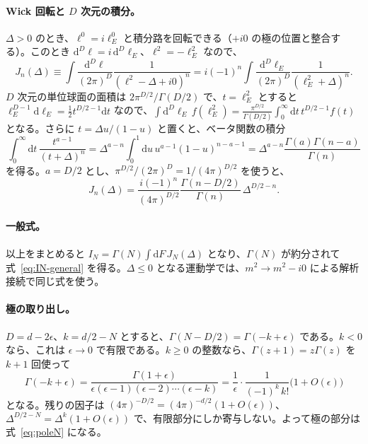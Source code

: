 \documentclass[a4paper,10pt]{ltjsarticle}
\newcommand{\dd}{\mathrm{d}}
\begin{document}
\paragraph{Wick 回転と $D$ 次元の積分。}$\Delta>0$ のとき、$\ell^0=i\ell_E^0$ と積分路を回転できる（$+i0$ の極の位置と整合する）。このとき $\dd^D\ell=i\,\dd^D\ell_E$、$\ell^2=-\ell_E^2$ なので、
\begin{equation*}
J_n(\Delta)\equiv\int\frac{\dd^D\ell}{(2\pi)^D}\frac{1}{(\ell^2-\Delta+i0)^n}=i(-1)^n\int\frac{\dd^D\ell_E}{(2\pi)^D}\frac{1}{(\ell_E^2+\Delta)^n}.
\end{equation*}
$D$ 次元の単位球面の面積は $2\pi^{D/2}/\Gamma(D/2)$ で、$t=\ell_E^2$ とすると $\ell_E^{D-1}\dd\ell_E=\tfrac12t^{D/2-1}\dd t$ なので、$\int\dd^D\ell_E\,f(\ell_E^2)=\frac{\pi^{D/2}}{\Gamma(D/2)}\int_0^\infty\dd t\,t^{D/2-1}f(t)$ となる。さらに $t=\Delta u/(1-u)$ と置くと、ベータ関数の積分
\begin{equation*}
\int_0^\infty\dd t\,\frac{t^{a-1}}{(t+\Delta)^n}=\Delta^{a-n}\int_0^1\dd u\,u^{a-1}(1-u)^{n-a-1}=\Delta^{a-n}\frac{\Gamma(a)\Gamma(n-a)}{\Gamma(n)}
\end{equation*}
を得る。$a=D/2$ とし、$\pi^{D/2}/(2\pi)^D=1/(4\pi)^{D/2}$ を使うと、
\begin{equation*}
J_n(\Delta)=\frac{i(-1)^n}{(4\pi)^{D/2}}\frac{\Gamma(n-D/2)}{\Gamma(n)}\,\Delta^{D/2-n}.
\end{equation*}

\paragraph{一般式。}以上をまとめると $I_N=\Gamma(N)\int\dd F\,J_N(\Delta)$ となり、$\Gamma(N)$ が約分されて式~\eqref{eq:IN-general} を得る。$\Delta\le0$ となる運動学では、$m^2\to m^2-i0$ による解析接続で同じ式を使う。

\paragraph{極の取り出し。}$D=d-2\epsilon$、$k=d/2-N$ とすると、$\Gamma(N-D/2)=\Gamma(-k+\epsilon)$ である。$k<0$ なら、これは $\epsilon\to0$ で有限である。$k\ge0$ の整数なら、$\Gamma(z+1)=z\Gamma(z)$ を $k+1$ 回使って
\begin{equation*}
\Gamma(-k+\epsilon)=\frac{\Gamma(1+\epsilon)}{\epsilon(\epsilon-1)(\epsilon-2)\cdots(\epsilon-k)}
=\frac{1}{\epsilon}\cdot\frac{1}{(-1)^k\,k!}\bigl(1+O(\epsilon)\bigr)
\end{equation*}
となる。残りの因子は $(4\pi)^{-D/2}=(4\pi)^{-d/2}(1+O(\epsilon))$、$\Delta^{D/2-N}=\Delta^{k}(1+O(\epsilon))$ で、有限部分にしか寄与しない。よって極の部分は式~\eqref{eq:poleN} になる。
\end{document}
